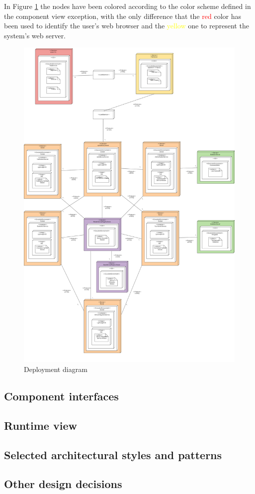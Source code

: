 In Figure \ref{deployment_diagram} the nodes have been colored according to the color scheme defined in the component view exception, with the only difference that the \textcolor{red}{red} color has been used to identify the user's web browser and the \textcolor{yellow}{yellow} one to represent the system's web server.
\begin{figure}[H]
    \centering
    \vspace{-4cm}
    \hspace{1cm}
    \includegraphics[width=1.1\textwidth]{Diagrams/deployment_diagram.png}
    \caption{Deployment diagram}
    \label{deployment_diagram}
\end{figure}

\subsection{Component interfaces}
\subsection{Runtime view}
\subsection{Selected architectural styles and patterns}
\subsection{Other design decisions}